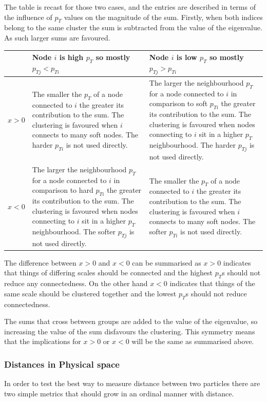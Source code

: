 The table is recast for those two cases, and the entries are described in terms of the influence of \(p_T\)
values on the magnitude of the sum.
Firstly, when both indices belong to the same cluster the sum is subtracted from the value of the eigenvalue. As such larger sums are favoured.
\begin{center}
    \begin{tabular}{c | p{} p{}}
                & Node \(i\) is high \(p_T\) so mostly \(p_{Tj} < p_{Ti}\) & Node \(i\) is low \(p_T\) so mostly \(p_{Tj} > p_{Ti}\) \\
        \hline
        \(x>0\) & The smaller the \(p_T\) of a node connected to \(i\) the greater its contribution to the sum. The clustering is favoured when \(i\) connects to many soft nodes. The harder \(p_{Ti}\) is not used directly.&
        The larger the neighbourhood \(p_T\) for a node connected to \(i\) in comparison to soft \(p_{Ti}\) the greater its contribution to the sum. The clustering is favoured when nodes connecting to \(i\) sit in a higher \(p_T\) neighbourhood. The harder \(p_{Tj}\) is not used directly.\\
        \(x < 0\) &  The larger the neighbourhood \(p_T\) for a node connected to \(i\) in comparison to hard \(p_{Ti}\) the greater its contribution to the sum. The clustering is favoured when nodes connecting to \(i\) sit in a higher \(p_T\) neighbourhood. The softer \(p_{Tj}\) is not used directly. &
        The smaller the \(p_T\) of a node connected to \(i\) the greater its contribution to the sum. The clustering is favoured when \(i\) connects to many soft nodes. The softer \(p_{Ti}\) is not used directly.\\
    \end{tabular}
\end{center}

The difference between \(x > 0\) and \(x < 0\) can be summarised as \(x > 0\) indicates that things
of differing scales should be connected and the highest \(p_T\)s should not reduce any connectedness.
On the other hand \(x < 0\) indicates that things of the same scale should be clustered together and the lowest \(p_T\)s should not reduce connectedness.


The sums that cross between groups are added to the value of the eigenvalue,
so increasing the value of the sum disfavours the clustering.
This symmetry means that the implications for \(x > 0\) or \(x < 0\) will be the same as summarised above.

\subsubsection{Distances in Physical space}\label{sec:distance_in_physical}
In order to test the best way to measure distance between two particles
there are two simple metrics
that should grow in an ordinal manner with distance.

